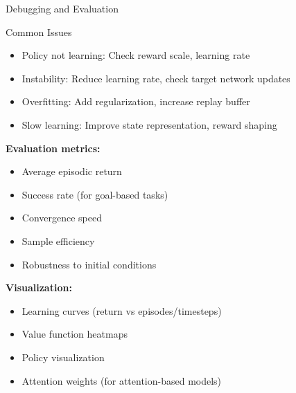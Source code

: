 \documentclass[aspectratio=169]{beamer}
\begin{document}
\begin{frame}{Debugging and Evaluation}
  \begin{alertbox}{Common Issues}
    \begin{itemize}
      \item Policy not learning: Check reward scale, learning rate
      \item Instability: Reduce learning rate, check target network updates
      \item Overfitting: Add regularization, increase replay buffer
      \item Slow learning: Improve state representation, reward shaping
    \end{itemize}
  \end{alertbox}

  \vspace{0.5em}

  \textbf{Evaluation metrics:}
  \begin{itemize}
    \item Average episodic return
    \item Success rate (for goal-based tasks)
    \item Convergence speed
    \item Sample efficiency
    \item Robustness to initial conditions
  \end{itemize}

  \vspace{0.5em}

  \textbf{Visualization:}
  \begin{itemize}
    \item Learning curves (return vs episodes/timesteps)
    \item Value function heatmaps
    \item Policy visualization
    \item Attention weights (for attention-based models)
  \end{itemize}
\end{frame}
\end{document}
